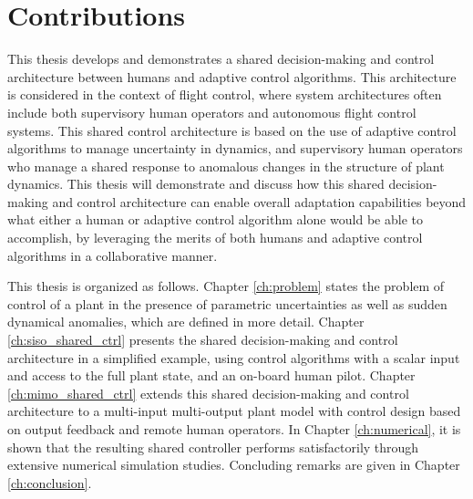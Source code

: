 \section{Contributions}

This thesis develops and demonstrates a shared decision-making and control architecture between humans and adaptive control algorithms. This architecture is considered in the context of flight control, where system architectures often include both supervisory human operators and autonomous flight control systems. This shared control architecture is based on the use of adaptive control algorithms to manage uncertainty in dynamics, and supervisory human operators who manage a shared response to anomalous changes in the structure of plant dynamics. This thesis will demonstrate and discuss how this shared decision-making and control architecture can enable overall adaptation capabilities beyond what either a human or adaptive control algorithm alone would be able to accomplish, by leveraging the merits of both humans and adaptive control algorithms in a collaborative manner. 

This thesis is organized as follows. Chapter \ref{ch:problem} states the problem of control of a plant in the presence of parametric uncertainties as well as sudden dynamical anomalies, which are defined in more detail. Chapter \ref{ch:siso_shared_ctrl} presents the shared decision-making and control architecture in a simplified example, using control algorithms with a scalar input and access to the full plant state, and an on-board human pilot. Chapter \ref{ch:mimo_shared_ctrl} extends this shared decision-making and control architecture to a multi-input multi-output plant model with control design based on output feedback and remote human operators. In Chapter \ref{ch:numerical}, it is shown that the resulting shared controller performs satisfactorily through extensive numerical simulation studies. Concluding remarks are given in Chapter \ref{ch:conclusion}.

